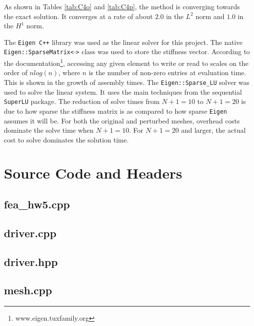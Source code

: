 \documentclass[a4paper, 12pt]{article}
\begin{document}
As shown in Tables \ref{tab:C4o} and \ref{tab:C4p}, 
the method is converging towards the exact solution. 
It converges at a rate of about $2.0$ in the $L^2$ norm
and $1.0$ in the $H^1$ norm.

The \texttt{Eigen C++} library
was used as the linear solver for this project. 
The native \texttt{Eigen::SparseMatrix<$\cdot$>} class was used to 
store the stiffness vector.
According to the documentation\footnote{www.eigen.tuxfamily.org}, 
accessing any given element to write or read to 
scales on the order of $nlog(n)$, where $n$ is 
the number of non-zero entries at evaluation time.
This is shown in the growth of assembly times.
The \texttt{Eigen::Sparse\_LU} solver was used to 
solve the linear system.
It uses the main techniques from the sequential
\texttt{SuperLU} package.
The reduction of solve times from $N+1=10$ to 
$N+1=20$ is due to how sparse the stiffness matrix is
as compared to how sparse \texttt{Eigen} assumes it will be.
For both the original and perturbed meshes, overhead costs
dominate the solve time when $N+1=10$. 
For $N+1=20$ and larger, the actual cost to solve dominates
the solution time.


\newpage
\appendix
\section{Source Code and Headers} \label{sec:code}

\subsection{fea\_hw5.cpp} \label{subsec:fea_hw5.cpp}


\subsection{driver.cpp} \label{subsec:driver.cpp}

\subsection{driver.hpp} \label{subsec:driver.hpp}


\subsection{mesh.cpp} \label{subsec:mesh.cpp}

\end{document}
